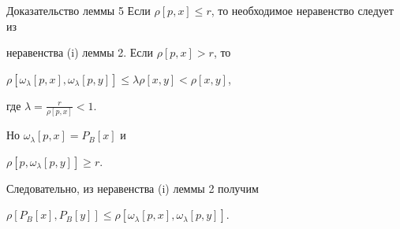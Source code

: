 \begin{pf*}{Доказательство леммы 5}
Если $\rho [p,x] \leq r$, то необходимое неравенство следует из 


неравенства (i) леммы 2. Если $\rho [p,x] > r$, то 


$\rho [\omega_{\lambda}[p,x],\omega_{\lambda}[p,y]] \leq


\lambda\rho [x,y] < \rho [x,y] $,


где $\lambda =\frac{r}{\rho [p,x]} < 1$.


Но $\omega_{\lambda}[p,x] = P_{B}[x]$ и 


$\rho [p,\omega_{\lambda}[p,y]] \geq r$.


Следовательно, из неравенства (i) леммы 2 получим


$\rho [P_{B}[x],P_{B}[y]] \leq


\rho [\omega_{\lambda}[p,x],\omega_{\lambda}[p,y]]$.


\end{pf*}









